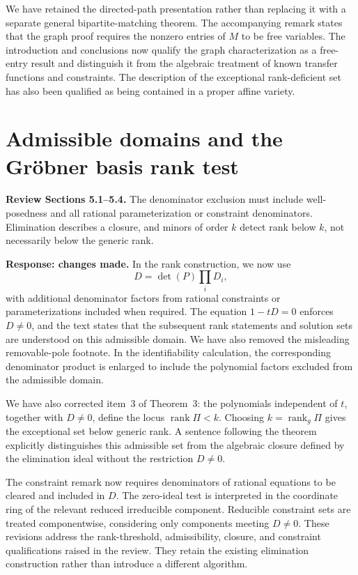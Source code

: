 \documentclass[11pt]{article}
\begin{document}
We have retained the directed-path presentation rather than replacing it with a
separate general bipartite-matching theorem. The accompanying remark states that
the graph proof requires the nonzero entries of $M$ to be free variables.
The introduction and conclusions now qualify the graph characterization as a
free-entry result and distinguish it from the algebraic treatment of known
transfer functions and constraints. The description of the exceptional
rank-deficient set has also been qualified as being contained in a proper
affine variety.

\section{Admissible domains and the Gr\"obner basis rank test}
\textbf{Review Sections 5.1--5.4.}
The denominator exclusion must include well-posedness and all rational
parameterization or constraint denominators. Elimination describes a closure,
and minors of order $k$ detect rank below $k$, not necessarily below the generic
rank.

\textbf{Response: changes made.}
In the rank construction, we now use
\[
D=\det(P)\prod_i D_i,
\]
with additional denominator factors from rational constraints or
parameterizations included when required. The equation $1-tD=0$ enforces
$D\ne0$, and the text states that the subsequent rank statements and solution
sets are understood on this admissible domain. We have also removed the
misleading removable-pole footnote. In the identifiability calculation, the
corresponding denominator product is enlarged to include the polynomial factors
excluded from the admissible domain.

We have also corrected item~3 of Theorem~3: the polynomials independent of $t$,
together with $D\ne0$, define the locus $\operatorname{rank}\Pi<k$.
Choosing $k=\operatorname{rank}_g\Pi$ gives the exceptional set below generic
rank. A sentence following the theorem explicitly distinguishes this admissible
set from the algebraic closure defined by the elimination ideal without the
restriction $D\ne0$.

The constraint remark now requires denominators of rational equations to be
cleared and included in $D$. The zero-ideal test is interpreted in the coordinate
ring of the relevant reduced irreducible component. Reducible constraint sets
are treated componentwise, considering only components meeting $D\ne0$.
These revisions address the rank-threshold, admissibility, closure, and
constraint qualifications raised in the review. They retain the existing
elimination construction rather than introduce a different algorithm.
\end{document}

